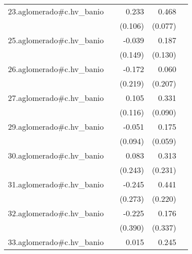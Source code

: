 {\begin{longtable}{l*{4}{D{.}{.}{-1}}}
\addlinespace
23.aglomerado#c.hv\_banio&                     &       0.233\sym{*}  &       0.468\sym{***}&                     \\
            &                     &     (0.106)         &     (0.077)         &                     \\
\addlinespace
25.aglomerado#c.hv\_banio&                     &      -0.039         &       0.187         &                     \\
            &                     &     (0.149)         &     (0.130)         &                     \\
\addlinespace
26.aglomerado#c.hv\_banio&                     &      -0.172         &       0.060         &                     \\
            &                     &     (0.219)         &     (0.207)         &                     \\
\addlinespace
27.aglomerado#c.hv\_banio&                     &       0.105         &       0.331\sym{***}&                     \\
            &                     &     (0.116)         &     (0.090)         &                     \\
\addlinespace
29.aglomerado#c.hv\_banio&                     &      -0.051         &       0.175\sym{**} &                     \\
            &                     &     (0.094)         &     (0.059)         &                     \\
\addlinespace
30.aglomerado#c.hv\_banio&                     &       0.083         &       0.313         &                     \\
            &                     &     (0.243)         &     (0.231)         &                     \\
\addlinespace
31.aglomerado#c.hv\_banio&                     &      -0.245         &       0.441\sym{*}  &                     \\
            &                     &     (0.273)         &     (0.220)         &                     \\
\addlinespace
32.aglomerado#c.hv\_banio&                     &      -0.225         &       0.176         &                     \\
            &                     &     (0.390)         &     (0.337)         &                     \\
\addlinespace
33.aglomerado#c.hv\_banio&                     &       0.015         &       0.245\sym{***}&                     \\

\end{longtable}}

